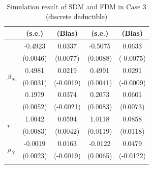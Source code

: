 \begin{table}[!ht]
{{\begin{minipage}{0.5\textwidth}
\begin{tabular}{lcccc}
        & (s.e.) & (Bias) & (s.e.) & (Bias) \\
        \midrule
        \multirow{6}{*}{$\beta_N$} & -0.4923 & 0.0337 & -0.5075 & 0.0633 \\
         & (0.0046) & (0.0077) & (0.0088) & (-0.0075) \\
        \cmidrule{2-5}
         & 0.4981 & 0.0219 & 0.4991 & 0.0291 \\
         & (0.0031) & (-0.0019) & (0.0041) & (-0.0009) \\
        \cmidrule{2-5}
         & 0.1979 & 0.0374 & 0.2073 & 0.0601 \\
         & (0.0052) & (-0.0021) & (0.0083) & (0.0073) \\
        \midrule
        \multirow{2}{*}{$r$} & 1.0042 & 0.0594 & 1.0118 & 0.0858 \\
         & (0.0083) & (0.0042) & (0.0119) & (0.0118) \\
        \midrule
        \multirow{2}{*}{$\rho_N$} & -0.0019 & 0.0163 & -0.0122 & 0.0479 \\
         & (0.0023) & (-0.0019) & (0.0065) & (-0.0122) \\
        \hhline{=====}
        \end{tabular}
    \end{minipage}
}
}
\caption{Simulation result of SDM and FDM in Case 3 (discrete deductible)}\label{tab:AppSimEndCase3}
\end{table}
